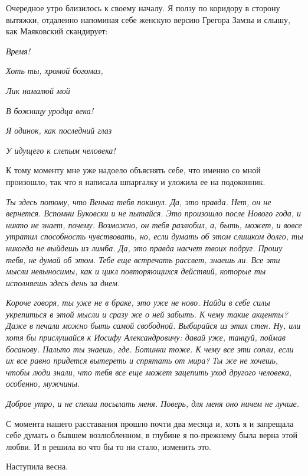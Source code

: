 \documentclass[
]{book}
\begin{document}
Очередное утро близилось к своему началу. Я ползу по коридору в сторону вытяжки, отдаленно напоминая себе женскую версию Грегора Замзы и слышу, как Маяковский скандирует:

\emph{Время!}

\emph{Хоть ты, хромой богомаз,}

\emph{Лик намалюй мой}

\emph{В божницу уродца века!}

\emph{Я одинок, как последний глаз}

\emph{У идущего к слепым человека!}

К тому моменту мне уже надоело объяснять себе, что именно со мной произошло, так что я написала шпаргалку и уложила ее на подоконник.

\emph{Ты здесь потому, что Венька тебя покинул. Да, это правда. Нет, он не вернется. Вспомни Буковски и не пытайся. Это произошло после Нового года, и никто не знает, почему. Возможно, он тебя разлюбил, а, быть, может, и вовсе утратил способность чувствовать, но, если думать об этом слишком долго, ты никогда не выйдешь из лимба. Да, это правда насчет твоих подруг. Прошу тебя, не думай об этом. Тебе еще встречать рассвет, знаешь ли. Все эти мысли невыносимы, как и цикл повторяющихся действий, которые ты исполняешь здесь день за днем.}

\emph{Короче говоря, ты уже не в браке, это уже не ново. Найди в себе силы укрепиться в этой мысли и сразу же о ней забыть. К чему такие акценты? Даже в печали можно быть самой свободной. Выбирайся из этих стен. Ну, или хотя бы прислушайся к Иосифу Александровичу: давай уже, танцуй, поймав босанову. Пальто ты знаешь, где. Ботинки тоже. К чему все эти сопли, если их все равно придется вытереть и спрятать от мира? Ты же не хочешь, чтобы люди знали, что тебя все еще может зацепить уход другого человека, особенно, мужчины.}

\emph{Доброе утро, и не спеши посылать меня. Поверь, для меня оно ничем не лучше.}

С момента нашего расставания прошло почти два месяца и, хоть я и запрещала себе думать о бывшем возлюбленном, в глубине я по-прежнему была верна этой любви. И я решила во что бы то ни стало, изменить это.

Наступила весна.
\end{document}
